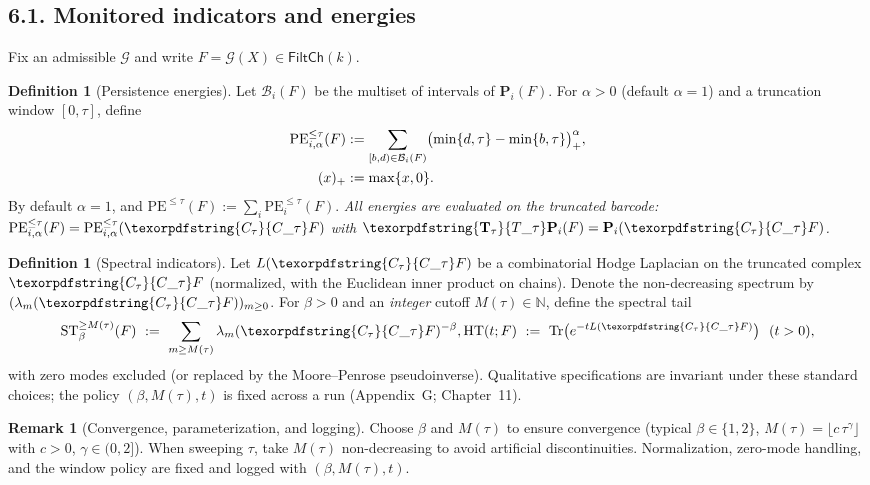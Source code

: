 \documentclass[11pt]{article}
\DeclareRobustCommand{\hyp}{\nobreakdash-}
\numberwithin{equation}{section}
\theoremstyle{definition}
\newtheorem{definition}[theorem]{Definition}
\newtheorem{remark}[theorem]{Remark}
\DeclareRobustCommand{\FiltCh}[1]{\mathsf{FiltCh}(#1)}
\DeclareRobustCommand{\Ttau}{\texorpdfstring{\ensuremath{\mathbf{T}_{\tau}}}{T\_\tau}}
\DeclareRobustCommand{\Ctau}{\texorpdfstring{\ensuremath{C_{\tau}}}{C\_\tau}}
\providecommand{\n}{\unskip\space}
\begin{document}
\subsection*{6.1. Monitored indicators and energies}
Fix an admissible \(\mathcal{G}\) and write \(F=\mathcal{G}(X)\in \FiltCh{k}\).

\begin{definition}[Persistence energies]\label{def:PE}
Let \(\mathcal{B}_i(F)\) be the multiset of intervals of \(\mathbf{P}_i(F)\).
For \(\alpha>0\) (default \(\alpha=1\)) and a truncation window \([0,\tau]\), define
\begin{equation}\label{eq:PE-alpha-trunc}
\begin{aligned}
\mathrm{PE}_{i,\alpha}^{\le\tau}(F)
&:= \sum_{[b,d)\in \mathcal{B}_i(F)}
   \bigl(\min\{d,\tau\}-\min\{b,\tau\}\bigr)_{+}^{\alpha},\\\n(x)_{+}&:=\max\{x,0\}.
\end{aligned}
\end{equation}
By default \(\alpha=1\), and \(\mathrm{PE}^{\le\tau}(F):=\sum_i \mathrm{PE}_{i}^{\le\tau}(F)\).
\emph{All energies are evaluated on the truncated barcode: \(\mathrm{PE}_{i,\alpha}^{\le\tau}(F)=\mathrm{PE}_{i,\alpha}^{\le\tau}(\Ctau F)\) with \(\Ttau\mathbf{P}_i(F)=\mathbf{P}_i(\Ctau F)\).}
\end{definition}

\begin{definition}[Spectral indicators]\label{def:spectral}
Let \(L(\Ctau F)\) be a combinatorial Hodge Laplacian on the truncated complex \(\Ctau F\) (normalized, with the Euclidean inner product on chains). Denote the non\hyp decreasing spectrum by \((\lambda_m(\Ctau F))_{m\ge 0}\). For \(\beta>0\) and an \emph{integer} cutoff \(M(\tau)\in\mathbb{N}\), define the spectral tail
\[
  \mathrm{ST}_{\beta}^{\ge M(\tau)}(F)\ :=\ \sum_{m\ge M(\tau)} \lambda_m(\Ctau F)^{-\beta},\n  \qquad\n  \mathrm{HT}(t;F)\ :=\ \mathrm{Tr}\big(e^{-tL(\Ctau F)}\big)\ \ (t>0),
\]
with zero modes excluded (or replaced by the Moore–Penrose pseudoinverse). Qualitative specifications are invariant under these standard choices; the policy \((\beta,M(\tau),t)\) is fixed across a run (Appendix~G; Chapter~11).
\end{definition}

\begin{remark}[Convergence, parameterization, and logging]\label{rk:ST-conv}
Choose \(\beta\) and \(M(\tau)\) to ensure convergence (typical \(\beta\in\{1,2\}\), \(M(\tau)=\lfloor c\,\tau^{\gamma}\rfloor\) with \(c>0\), \(\gamma\in(0,2]\)).
When sweeping \(\tau\), take \(M(\tau)\) non\hyp decreasing to avoid artificial discontinuities.
Normalization, zero\hyp mode handling, and the window policy are fixed and logged with \((\beta,M(\tau),t)\).
\end{remark}
\end{document}
